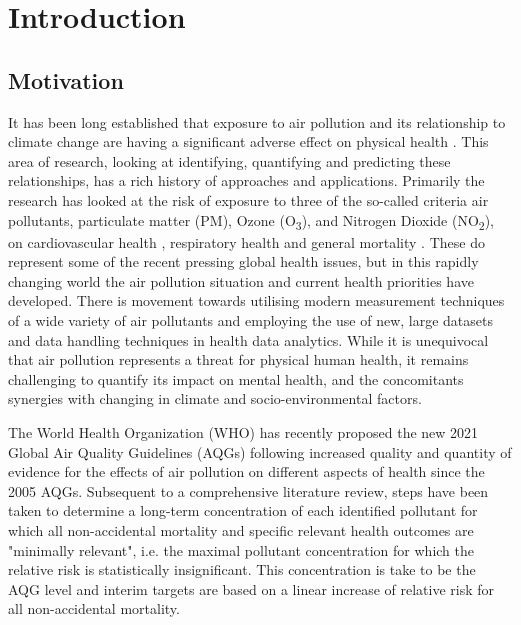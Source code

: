 \chapter{Introduction}

\section{Motivation} \label{Section:Motivation}
    
It has been long established that exposure to air pollution and its relationship to climate change are having a significant adverse effect on physical health \citep{2021AirHealth}. This area of research, looking at identifying, quantifying and predicting these relationships, has a rich history of approaches and applications. Primarily the research has looked at the risk of exposure to three of the so-called criteria air pollutants, particulate matter (PM), Ozone (O\textsubscript{3}), and Nitrogen Dioxide (NO\textsubscript{2}), on cardiovascular health \citep[e.g.][]{Rajagopalan2018AirReview}, respiratory health \citep[e.g.][]{Saleh2020AirReview} and general mortality \citep[e.g.][]{Anderson2009AirHistory}. These do represent some of the recent pressing global health issues, but in this rapidly changing world the air pollution situation and current health priorities have developed. There is movement towards utilising modern measurement techniques of a wide variety of air pollutants and employing the use of new, large datasets and data handling techniques in health data analytics. While it is unequivocal that air pollution represents a threat for physical human health, it remains challenging to quantify its impact on mental health, and the concomitants synergies with changing in climate and socio-environmental factors.

The World Health Organization (WHO) has recently proposed the new 2021 Global Air Quality Guidelines (AQGs) \citep{WorldHealthOrganization2021WHOMonoxide} following increased quality and quantity of evidence for the effects of air pollution on different aspects of health since the 2005 AQGs. Subsequent to a comprehensive literature review, steps have been taken to determine a long-term concentration of each identified pollutant for which all non-accidental mortality and specific relevant health outcomes are "minimally relevant", i.e. the maximal pollutant concentration for which the relative risk is statistically insignificant. This concentration is take to be the AQG level and interim targets are based on a linear increase of relative risk for all non-accidental mortality.

